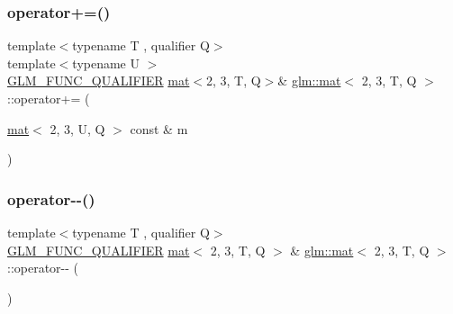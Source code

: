 \mbox{\label{structglm_1_1mat_3_012_00_013_00_01_t_00_01_q_01_4_a1ff8573bb278d2bc14b3360a652de986}} 
\subsubsection{\texorpdfstring{operator+=()}{operator+=()}\hspace{0.1cm}{\footnotesize\ttfamily [4/4]}}
{\footnotesize\ttfamily template$<$typename T , qualifier Q$>$ \\
template$<$typename U $>$ \\
\mbox{\hyperlink{setup_8hpp_a33fdea6f91c5f834105f7415e2a64407}{G\+L\+M\+\_\+\+F\+U\+N\+C\+\_\+\+Q\+U\+A\+L\+I\+F\+I\+ER}} \mbox{\hyperlink{structglm_1_1mat}{mat}}$<$2, 3, T, Q$>$\& \mbox{\hyperlink{structglm_1_1mat}{glm\+::mat}}$<$ 2, 3, T, Q $>$\+::operator+= (\begin{DoxyParamCaption}\item[{\mbox{\hyperlink{structglm_1_1mat}{mat}}$<$ 2, 3, U, Q $>$ const \&}]{m }\end{DoxyParamCaption})}

\mbox{\label{structglm_1_1mat_3_012_00_013_00_01_t_00_01_q_01_4_a828a596a4d82b6e970290f9c0449da87}} 
\subsubsection{\texorpdfstring{operator-\/-\/()}{operator--()}\hspace{0.1cm}{\footnotesize\ttfamily [1/2]}}
{\footnotesize\ttfamily template$<$typename T , qualifier Q$>$ \\
\mbox{\hyperlink{setup_8hpp_a33fdea6f91c5f834105f7415e2a64407}{G\+L\+M\+\_\+\+F\+U\+N\+C\+\_\+\+Q\+U\+A\+L\+I\+F\+I\+ER}} \mbox{\hyperlink{structglm_1_1mat}{mat}}$<$ 2, 3, T, Q $>$ \& \mbox{\hyperlink{structglm_1_1mat}{glm\+::mat}}$<$ 2, 3, T, Q $>$\+::operator-\/-\/ (\begin{DoxyParamCaption}{ }\end{DoxyParamCaption})}

